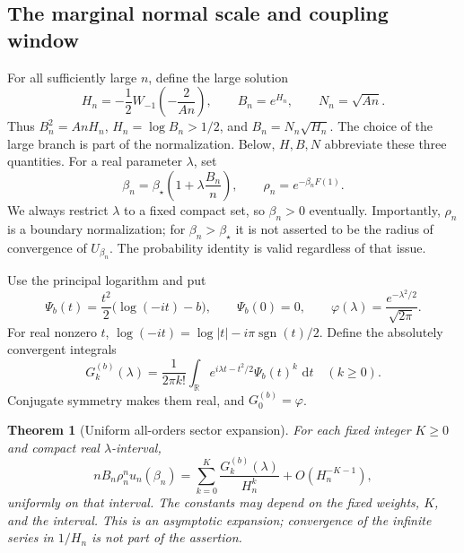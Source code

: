 \documentclass[11pt,a4paper]{article}
\numberwithin{equation}{section}
\newtheorem{theorem}{Theorem}[section]
\theoremstyle{definition}
\theoremstyle{remark}
\newcommand{\R}{\mathbb R}
\newcommand{\dd}{\,\mathrm d}
\newcommand{\bs}{\beta_\star}
\newcommand{\ph}{\varphi}
\begin{document}
\subsection{The marginal normal scale and coupling window}
For all sufficiently large \(n\), define the large solution
\begin{equation}
 H_n=-\frac12W_{-1}\!\left(-\frac{2}{An}\right),\qquad
 B_n=e^{H_n},\qquad N_n=\sqrt{An}.
 \label{eq:normal-scale}
\end{equation}
Thus \(B_n^2=AnH_n\), \(H_n=\log B_n>1/2\), and
\(B_n=N_n\sqrt{H_n}\). The choice of the large branch is part of the
normalization. Below, \(H,B,N\) abbreviate these three quantities.
For a real parameter \(\lambda\), set
\begin{equation}
 \beta_n=\bs\left(1+\lambda\frac{B_n}{n}\right),\qquad
 \rho_n=e^{-\beta_n F(1)}.
 \label{eq:coupling-window}
\end{equation}
We always restrict \(\lambda\) to a fixed compact set, so \(\beta_n>0\)
eventually. Importantly, \(\rho_n\) is a boundary normalization; for
\(\beta_n>\bs\) it is not asserted to be the radius of convergence of
\(U_{\beta_n}\). The probability identity is valid regardless of that issue.

Use the principal logarithm and put
\begin{equation}
 \Psi_b(t)=\frac{t^2}{2}\bigl(\log(-it)-b\bigr),\qquad \Psi_b(0)=0,
 \qquad \ph(\lambda)=\frac{e^{-\lambda^2/2}}{\sqrt{2\pi}}.
 \label{eq:Psi}
\end{equation}
For real nonzero \(t\), \(\log(-it)=\log|t|-i\pi\operatorname{sgn}(t)/2\).
Define the absolutely convergent integrals
\begin{equation}
 G_k^{(b)}(\lambda)=\frac{1}{2\pi k!}
 \int_{\R}e^{i\lambda t-t^2/2}\Psi_b(t)^k\,\dd t
 \quad(k\ge0).
 \label{eq:Gk}
\end{equation}
Conjugate symmetry makes them real, and \(G_0^{(b)}=\ph\).

\begin{theorem}[Uniform all-orders sector expansion]
\label{thm:allorders}
For each fixed integer \(K\ge0\) and compact real \(\lambda\)-interval,
\begin{equation}
 nB_n\rho_n^n u_n(\beta_n)
 =\sum_{k=0}^{K}\frac{G_k^{(b)}(\lambda)}{H_n^k}
 +O(H_n^{-K-1}),
 \label{eq:allorders}
\end{equation}
uniformly on that interval. The constants may depend on the fixed weights,
\(K\), and the interval. This is an asymptotic expansion; convergence of the
infinite series in \(1/H_n\) is not part of the assertion.
\end{theorem}
\end{document}
